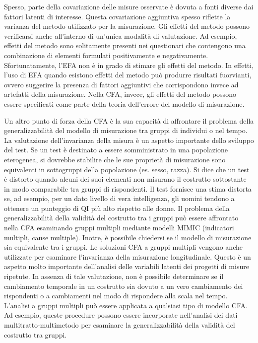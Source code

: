 \documentclass[
  11pt,
]{krantz}
\theoremstyle{definition}
\theoremstyle{definition}
\theoremstyle{definition}
\theoremstyle{definition}
\theoremstyle{remark}
\begin{document}
Spesso, parte della covariazione delle misure osservate è dovuta a fonti diverse dai fattori latenti di interesse. Questa covariazione aggiuntiva spesso riflette la varianza del metodo utilizzato per la misurazione. Gli effetti del metodo possono verificarsi anche all'interno di un'unica modalità di valutazione. Ad esempio, effetti del metodo sono solitamente presenti nei questionari che contengono una combinazione di elementi formulati positivamente e negativamente. Sfortunatamente, l'EFA non è in grado di stimare gli effetti del metodo. In effetti, l'uso di EFA quando esistono effetti del metodo può produrre risultati fuorvianti, ovvero suggerire la presenza di fattori aggiuntivi che corrispondono invece ad artefatti della misurazione. Nella CFA, invece, gli effetti del metodo possono essere specificati come parte della teoria dell'errore del modello di misurazione.

Un altro punto di forza della CFA è la sua capacità di affrontare il problema della generalizzabilità del modello di misurazione tra gruppi di individui o nel tempo. La valutazione dell'invarianza della misura è un aspetto importante dello sviluppo del test. Se un test è destinato a essere somministrato in una popolazione eterogenea, si dovrebbe stabilire che le sue proprietà di misurazione sono equivalenti in sottogruppi della popolazione (es. sesso, razza). Si dice che un test è distorto quando alcuni dei suoi elementi non misurano il costrutto sottostante in modo comparabile tra gruppi di rispondenti. Il test fornisce una stima distorta se, ad esempio, per un dato livello di vera intelligenza, gli uomini tendono a ottenere un punteggio di QI più alto rispetto alle donne. Il problema della generalizzabilità della validità del costrutto tra i gruppi può essere affrontato nella CFA esaminando gruppi multipli mediante modelli MIMIC (indicatori multipli, cause multiple). Inotre, è possibile chiedersi se il modello di misurazione sia equivalente tra i gruppi. Le soluzioni CFA a gruppi multipli vengono anche utilizzate per esaminare l'invarianza della misurazione longitudinale. Questo è un aspetto molto importante dell'analisi delle variabili latenti dei progetti di misure ripetute. In assenza di tale valutazione, non è possibile determinare se il cambiamento temporale in un costrutto sia dovuto a un vero cambiamento dei rispondenti o a cambiamenti nel modo di rispondere alla scala nel tempo. L'analisi a gruppi multipli può essere applicata a qualsiasi tipo di modello CFA. Ad esempio, queste procedure possono essere incorporate nell'analisi dei dati multitratto-multimetodo per esaminare la generalizzabilità della validità del costrutto tra gruppi.
\end{document}
